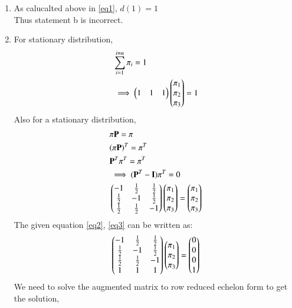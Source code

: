 \documentclass[journal,12pt,twocolumn]{IEEEtran}
\begin{document}
\begin{enumerate}
    \item{As calucalted above in \ref{eq1}, $d(1)=1$\\
    Thus statement b is incorrect.}\\
    \item{For stationary distribution,
    \begin{align}
    &\sum_{i=1}^{i=n} \pi_i = 1 \\
    &\implies\begin{pmatrix}1&1&1\end{pmatrix}\begin{pmatrix}\pi_1\\\pi_2\\\pi_3\end{pmatrix}=1\label{eq2}
    \end{align}
    Also for a stationary distribution,
    \begin{align}
    &\pi \mathbf{P} = \pi \\
    &(\pi \mathbf{P})^T = \pi^T \\
    &\mathbf{P}^T\pi^T=\pi^T\\
    &\implies (\mathbf{P}^T-\mathbf{I})\pi^T=0\\
    &\begin{pmatrix}-1&\frac{1}{2}&\frac{1}{2}\\\frac{1}{2}&-1&\frac{1}{2}\\\frac{1}{2}&\frac{1}{2}&-1\end{pmatrix}\begin{pmatrix}\pi_1\\\pi_2\\\pi_3\end{pmatrix}=\begin{pmatrix}\pi_1\\\pi_2\\\pi_3\end{pmatrix} \label{eq3}  
\end{align}
    The given equation \ref{eq2}, \ref{eq3} can be written as:\\
    \begin{align}
    \begin{pmatrix}-1&\frac{1}{2}&\frac{1}{2}\\\frac{1}{2}&-1&\frac{1}{2}\\\frac{1}{2}&\frac{1}{2}&-1\\1&1&1\end{pmatrix}\begin{pmatrix}\pi_1\\\pi_2\\\pi_3\end{pmatrix}=\begin{pmatrix}0\\0\\0\\1\end{pmatrix}
    \end{align}
    We need to solve the augmented matrix to row reduced echelon form to get the solution,    
    \begin{align}

\end{align}}
\end{enumerate}
\end{document}
